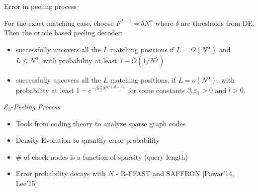 \documentclass[10pt,xcolor=table]{beamer}
\begin{document}
\begin{frame}{Error in peeling process}

\begin{lemma}
For the exact matching case, choose $F^{d-1}=\delta N^\alpha$ where $\delta$ are thresholds from DE. Then the oracle based peeling decoder:
\begin{itemize}
\item successfully uncovers all the $L$ matching positions if $L=\Omega(N^{\alpha})$ and $L\leq N^{\alpha}$, with probability at least $1-O(1/N^{\frac{1}{d}})$
\item successfully uncovers all the $L$ matching positions, if $L=o(N^{\alpha})$, with probability at least $1-e^{-\beta \varepsilon_1^2N^{\alpha/(4l+1)}}$ for some constants $\beta,\varepsilon_1>0$ and $l>0.$
\end{itemize}\label{Lem:peeling_exact}
\end{lemma}

\begin{block}{$\mathcal{E}_3${-\it Peeling Process}}
\begin{itemize}
\item Tools from coding theory to analyze sparse graph codes
\item Density Evolution to quantify error probability
\item \# of check-nodes is a function of sparsity (query length)
\item Error probability decays with $N$ - {\small R-FFAST and SAFFRON [Pawar'14, Lee'15]}
\end{itemize}
\end{block}
\end{frame}
\end{document}
